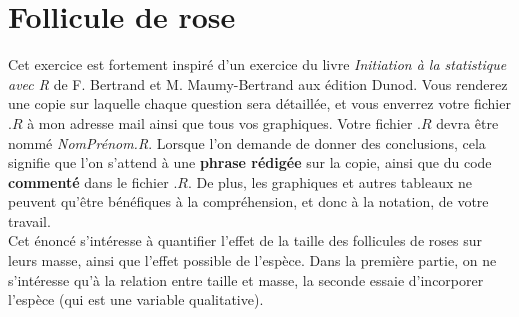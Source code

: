 \section{Follicule de rose}

Cet exercice est fortement inspiré d'un exercice du livre \textit{Initiation à la statistique avec R} de F. Bertrand et M. Maumy-Bertrand aux édition Dunod. Vous renderez une copie sur laquelle chaque question sera détaillée, et vous enverrez votre fichier $.R$ à mon adresse mail ainsi que tous vos graphiques. Votre fichier $.R$ devra être nommé \textit{NomPrénom.R}. Lorsque l'on demande de donner des conclusions, cela signifie que l'on s'attend à une \textbf{phrase rédigée} sur la copie, ainsi que du code \textbf{commenté} dans le fichier $.R$. De plus, les graphiques et autres tableaux ne peuvent qu'être bénéfiques à la compréhension, et donc à la notation, de votre travail.\\

Cet énoncé s'intéresse à quantifier l'effet de la taille des follicules de roses sur leurs masse, ainsi que l'effet possible de l'espèce. Dans la première partie, on ne s'intéresse qu'à la relation entre taille et masse, la seconde essaie d'incorporer l'espèce (qui est une variable qualitative).\\

